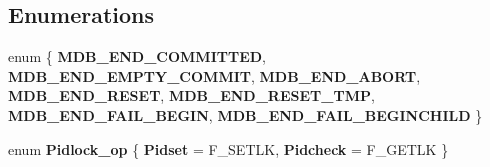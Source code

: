 \subsection*{Enumerations}
\begin{DoxyCompactItemize}
\item 
\mbox{\label{group__internal_ga726ca809ffd3d67ab4b8476646f26635}} 
enum \{ \newline
{\bfseries M\+D\+B\+\_\+\+E\+N\+D\+\_\+\+C\+O\+M\+M\+I\+T\+T\+ED}, 
{\bfseries M\+D\+B\+\_\+\+E\+N\+D\+\_\+\+E\+M\+P\+T\+Y\+\_\+\+C\+O\+M\+M\+IT}, 
{\bfseries M\+D\+B\+\_\+\+E\+N\+D\+\_\+\+A\+B\+O\+RT}, 
{\bfseries M\+D\+B\+\_\+\+E\+N\+D\+\_\+\+R\+E\+S\+ET}, 
\newline
{\bfseries M\+D\+B\+\_\+\+E\+N\+D\+\_\+\+R\+E\+S\+E\+T\+\_\+\+T\+MP}, 
{\bfseries M\+D\+B\+\_\+\+E\+N\+D\+\_\+\+F\+A\+I\+L\+\_\+\+B\+E\+G\+IN}, 
{\bfseries M\+D\+B\+\_\+\+E\+N\+D\+\_\+\+F\+A\+I\+L\+\_\+\+B\+E\+G\+I\+N\+C\+H\+I\+LD}
 \}
\item 
\mbox{\label{group__internal_ga9a1c6ff9e1c49dc7b1fd08ab3781f1d4}} 
enum {\bfseries Pidlock\+\_\+op} \{ {\bfseries Pidset} = F\+\_\+\+S\+E\+T\+LK, 
{\bfseries Pidcheck} = F\+\_\+\+G\+E\+T\+LK
 \}
\end{DoxyCompactItemize}
